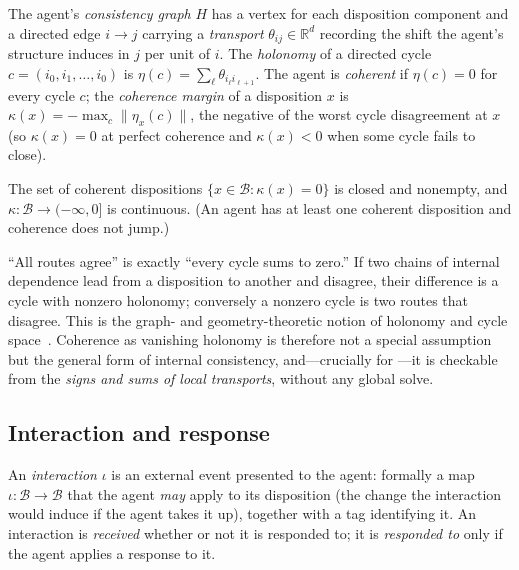 \documentclass[11pt,twocolumn,a4paper]{article}
\newcommand{\R}{\mathbb{R}}
\newcommand{\Beh}{\mathcal{B}}       %
\newcommand{\Int}{\iota}             %
\newcommand{\coh}{\kappa}            %
\newcommand{\norm}[1]{\lVert#1\rVert}
\begin{document}
\begin{definition}
\label{def:coherence}
The agent's \emph{consistency graph} $H$ has a vertex for each disposition
component and a directed edge $i\to j$ carrying a \emph{transport}
$\theta_{ij}\in\R^d$ recording the shift the agent's structure induces in
$j$ per unit of $i$. The \emph{holonomy} of a directed cycle
$c=(i_0,i_1,\dots,i_0)$ is $\eta(c)=\sum_\ell\theta_{i_\ell i_{\ell+1}}$.
The agent is \emph{coherent} if $\eta(c)=0$ for every cycle $c$; the
\emph{coherence margin} of a disposition $x$ is
$\coh(x)=-\max_c\norm{\eta_x(c)}$, the negative of the worst cycle
disagreement at $x$ (so $\coh(x)=0$ at perfect coherence and $\coh(x)<0$
when some cycle fails to close).
\end{definition}

\begin{axiom}
\label{ax:closed}
The set of coherent dispositions $\{x\in\Beh:\coh(x)=0\}$ is closed and
nonempty, and $\coh:\Beh\to(-\infty,0]$ is continuous. (An agent has at
least one coherent disposition and coherence does not jump.)
\end{axiom}

\begin{remark}
\label{rem:holonomy}
``All routes agree'' is exactly ``every cycle sums to zero.'' If two chains
of internal dependence lead from a disposition to another and disagree,
their difference is a cycle with nonzero holonomy; conversely a nonzero
cycle is two routes that disagree. This is the graph- and
geometry-theoretic notion of holonomy and cycle
space~\cite{bondymurty2008,diestel2017,hatcher2002,kobayashinomizu1963}.
Coherence as vanishing holonomy is therefore not a special assumption but
the general form of internal consistency, and---crucially for ---it is checkable
from the \emph{signs and sums of local transports}, without any global
solve.
\end{remark}

\subsection{Interaction and response}

\begin{definition}[Interaction]
\label{def:interaction}
An \emph{interaction} $\Int$ is an external event presented to the agent:
formally a map $\Int:\Beh\to\Beh$ that the agent \emph{may} apply to its
disposition (the change the interaction would induce if the agent takes it
up), together with a tag identifying it. An interaction is \emph{received}
whether or not it is responded to; it is \emph{responded to} only if the
agent applies a response to it.
\end{definition}
\end{document}
